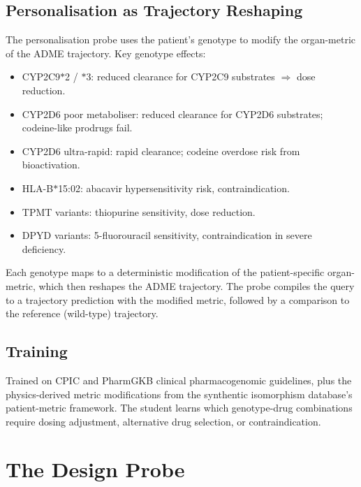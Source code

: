 \documentclass[11pt,twocolumn,a4paper]{article}
\theoremstyle{definition}
\theoremstyle{remark}
\begin{document}
\subsection{Personalisation as Trajectory Reshaping}

The personalisation probe uses the patient's genotype to modify the organ-metric of the ADME trajectory. Key genotype effects:
\begin{itemize}[nosep,leftmargin=*]
\item CYP2C9$\ast$2 / $\ast$3: reduced clearance for CYP2C9 substrates $\Rightarrow$ dose reduction.
\item CYP2D6 poor metaboliser: reduced clearance for CYP2D6 substrates; codeine-like prodrugs fail.
\item CYP2D6 ultra-rapid: rapid clearance; codeine overdose risk from bioactivation.
\item HLA-B$\ast$15:02: abacavir hypersensitivity risk, contraindication.
\item TPMT variants: thiopurine sensitivity, dose reduction.
\item DPYD variants: 5-fluorouracil sensitivity, contraindication in severe deficiency.
\end{itemize}

Each genotype maps to a deterministic modification of the patient-specific organ-metric, which then reshapes the ADME trajectory. The probe compiles the query to a trajectory prediction with the modified metric, followed by a comparison to the reference (wild-type) trajectory.

\subsection{Training}

Trained on CPIC and PharmGKB clinical pharmacogenomic guidelines, plus the physics-derived metric modifications from the synthentic isomorphism database's patient-metric framework. The student learns which genotype-drug combinations require dosing adjustment, alternative drug selection, or contraindication.

\section{The Design Probe}
\label{sec:design_probe}
\end{document}
